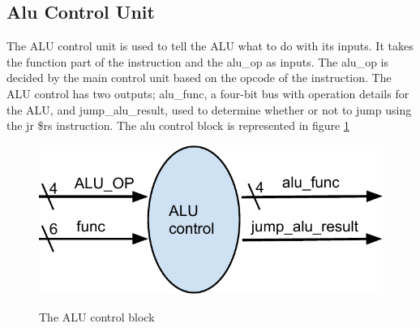 \subsection{Alu Control Unit}
The ALU control unit is used to tell the ALU what to do with its inputs. It takes the function part of the instruction and the alu\_op as inputs. The alu\_op is decided by the main control unit based on the opcode of the instruction. The ALU control has two outputs; alu\_func, a four-bit bus with operation details for the ALU, and jump\_alu\_result, used to determine whether or not to jump using the jr \$rs instruction. The alu control block is represented in figure \ref {fig:alu_control}
\begin{figure}[h]
	\includegraphics{figures/alu_control}
	\label{fig:alu_control}
	\caption{The ALU control block}
\end{figure}

